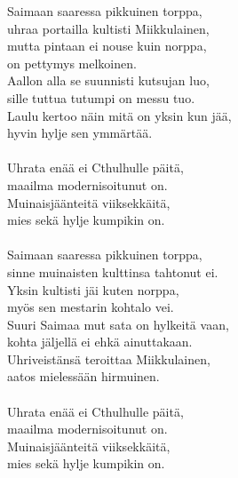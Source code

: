 
            Saimaan saaressa pikkuinen torppa, \\
            uhraa portailla kultisti Miikkulainen, \\
            mutta pintaan ei nouse kuin norppa, \\
            on pettymys melkoinen. \\
            Aallon alla se suunnisti kutsujan luo, \\
            sille tuttua tutumpi on messu tuo. \\
            Laulu kertoo näin mitä on yksin kun jää, \\
            hyvin hylje sen ymmärtää. \\
\hspace{10mm} \\
            Uhrata enää ei Cthulhulle päitä, \\
            maailma modernisoitunut on. \\
            Muinaisjäänteitä viiksekkäitä, \\
            mies sekä hylje kumpikin on. \\
\hspace{10mm} \\
            Saimaan saaressa pikkuinen torppa, \\
            sinne muinaisten kulttinsa tahtonut ei. \\
            Yksin kultisti jäi kuten norppa, \\
            myös sen mestarin kohtalo vei. \\
            Suuri Saimaa mut sata on hylkeitä vaan, \\
            kohta jäljellä ei ehkä ainuttakaan. \\
            Uhriveistänsä teroittaa Miikkulainen, \\
            aatos mielessään hirmuinen. \\
\hspace{10mm} \\
            Uhrata enää ei Cthulhulle päitä, \\
            maailma modernisoitunut on. \\
            Muinaisjäänteitä viiksekkäitä, \\
            mies sekä hylje kumpikin on. \\
\hspace{10mm} \\

